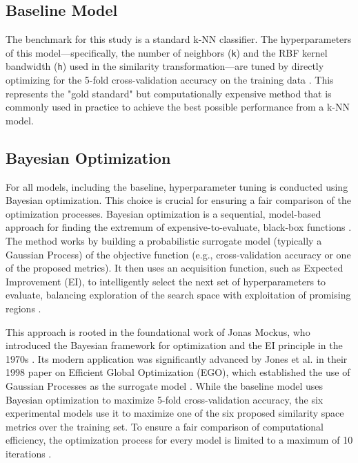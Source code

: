 \documentclass[conference]{IEEEtran}
\begin{document}
\subsection{Baseline Model}
The benchmark for this study is a standard k-NN classifier. The hyperparameters of this model—specifically, the number of neighbors (\texttt{k}) and the RBF kernel bandwidth (\texttt{h}) used in the similarity transformation—are tuned by directly optimizing for the 5-fold cross-validation accuracy on the training data \cite{b20}. This represents the "gold standard" but computationally expensive method that is commonly used in practice to achieve the best possible performance from a k-NN model.

\subsection{Bayesian Optimization}
For all models, including the baseline, hyperparameter tuning is conducted using Bayesian optimization. This choice is crucial for ensuring a fair comparison of the optimization processes. Bayesian optimization is a sequential, model-based approach for finding the extremum of expensive-to-evaluate, black-box functions \cite{b44, b45, b46}. The method works by building a probabilistic surrogate model (typically a Gaussian Process) of the objective function (e.g., cross-validation accuracy or one of the proposed metrics). It then uses an acquisition function, such as Expected Improvement (EI), to intelligently select the next set of hyperparameters to evaluate, balancing exploration of the search space with exploitation of promising regions \cite{b47, b48}.

This approach is rooted in the foundational work of Jonas Mockus, who introduced the Bayesian framework for optimization and the EI principle in the 1970s \cite{b47, b49}. Its modern application was significantly advanced by Jones et al. in their 1998 paper on Efficient Global Optimization (EGO), which established the use of Gaussian Processes as the surrogate model \cite{b50, b51, b52}. While the baseline model uses Bayesian optimization to maximize 5-fold cross-validation accuracy, the six experimental models use it to maximize one of the six proposed similarity space metrics over the training set. To ensure a fair comparison of computational efficiency, the optimization process for every model is limited to a maximum of 10 iterations \cite{b20}.
\end{document}
